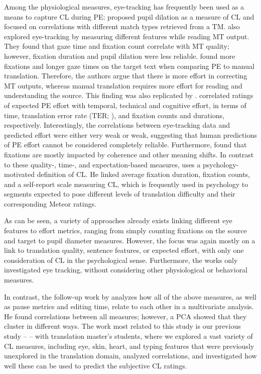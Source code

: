 \documentclass[output=paper]{langsci/langscibook}
\begin{document}
Among the physiological measures, eye-tracking has frequently been used as a means to capture CL during PE:
\citet{obrien_eye-tracking_2006} proposed pupil dilation as a measure of CL and focused on correlations with different match types retrieved from a TM.
\citet{doherty2010eye} also explored eye-tracking by measuring different features while reading MT output. They found that gaze time and fixation count correlate with MT quality; however, fixation duration and pupil dilation were less reliable.
\citet{carl2011process} found more fixations and longer gaze times on the target text when comparing PE to manual translation. Therefore, the authors argue that there is more effort in correcting MT outputs, whereas manual translation requires more effort for reading and understanding the source. This finding was also replicated by \citet{koglin2015empirical}.
\citet{moorkens_correlations_2015} correlated ratings of expected PE effort with temporal, technical and cognitive effort, in terms of time, translation error rate ($\mathrm{TER}$; \citealp{TER:2006,TERp:2009}), and fixation counts and durations, respectively. Interestingly, the correlations between eye-tracking data and predicted effort were either very weak or weak, suggesting that human predictions of PE effort cannot be considered completely reliable.
Furthermore, \citet{daems2016translation} found that fixations are mostly impacted by coherence and other meaning shifts.
In contrast to these quality-, time-, and expectation-based measures, \citet{vieira2014indices} uses a psychology-motivated definition of CL. He linked average fixation duration, fixation counts, and a self-report scale measuring CL, which is frequently used in psychology \citep{paas1994instructional} to segments expected to pose different levels of translation difficulty and their corresponding Meteor \citep{Lavie:2007} ratings.

As can be seen, a variety of approaches already exists linking different eye features to effort metrics, ranging from simply counting fixations on the source and target to pupil diameter measures. However, the focus was again mostly on a link to translation quality, sentence features, or expected effort, with only one consideration of CL in the psychological sense. Furthermore, the works only investigated eye tracking, without considering other physiological or behavioral measures.

In contrast, the follow-up work by \citet{vieira2016measures} analyzes how all of the above measures, as well as pause metrics and editing time, relate to each other in a multivariate analysis. He found correlations between all measures; however, a PCA showed that they cluster in different ways.
The work most related to this study is our previous study -- \cite{herbig2019mt} -- with translation master's students, where we explored a vast variety of CL measures, including eye, skin, heart, and typing features that were previously unexplored in the translation domain, analyzed correlations, and investigated how well these can be used to predict the subjective CL ratings.
\end{document}
